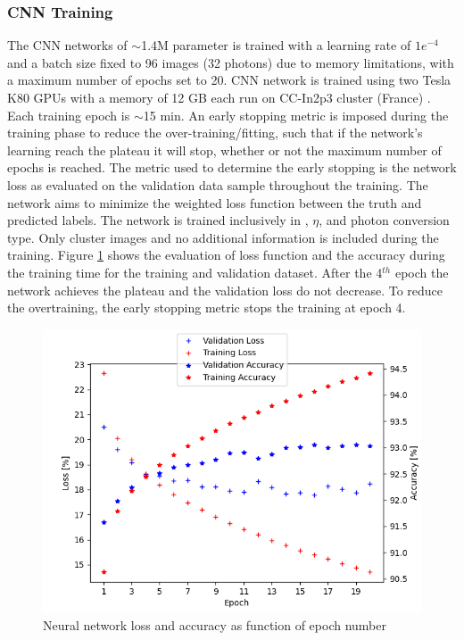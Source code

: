 \subsubsection{CNN Training}
\label{gamma:CNN:Training}
The CNN networks of $\sim$1.4M parameter is trained with a learning rate of $1e^{-4}$ and a batch size fixed to 96 images (32 photons) due to memory limitations, with a maximum number of epochs set to 20. CNN network is trained using two Tesla K80 GPUs with a memory of 12 GB each run on CC-In2p3 cluster (France) \cite{cca}. Each training epoch is $\sim$15 min. An early stopping metric \cite{early} is imposed during the training phase to reduce the over-training/fitting, such that if the network's learning reach the plateau it will stop, whether or not the maximum number of epochs is reached. The metric used to determine the early stopping is the network loss as evaluated on the validation data sample throughout the training. The network aims to minimize the weighted loss function between the truth and predicted labels.
The network is trained inclusively in \eT, $\eta$, and photon conversion type. Only cluster images and no additional information is included during the training.
Figure \ref{fig:gamma:CNN:Training:loss}  shows the evaluation of loss function and the accuracy during the training time for the training and validation dataset. After the 4$^{th}$ epoch the network achieves the plateau and the validation loss do not decrease. To reduce the overtraining, the early stopping metric stops the training at epoch 4.
\begin{figure}[htbp]
    \centering
    \includegraphics[width=.7\textwidth]{Ch3/Img/CNN_Loss_Accuracy.png}
    \caption{Neural network loss and accuracy as function of epoch number}
    \label{fig:gamma:CNN:Training:loss}
\end{figure}
